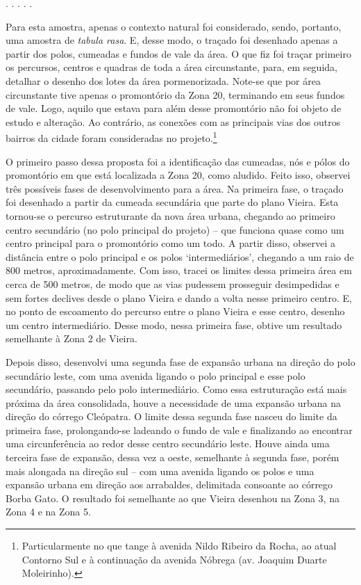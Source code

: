 \documentclass[12pt, a4paper]{book} %
\begin{document}
        \begin{center}
            . . . . .
        \end{center} 
        Para esta amostra, apenas o contexto natural foi considerado, sendo, portanto, uma amostra de \textit{tabula rasa}. E, desse modo, o traçado foi desenhado apenas a partir dos polos, cumeadas e fundos de vale da área. O que fiz foi traçar primeiro os percursos, centros e quadras de toda a área circunstante, para, em seguida, detalhar o desenho dos lotes da área pormenorizada. Note-se que por área circunstante tive apenas o promontório da Zona 20, terminando em seus fundos de vale. Logo, aquilo que estava para além desse promontório não foi objeto de estudo e alteração. Ao contrário, as conexões com as principais vias dos outros bairros da cidade foram consideradas no projeto.\footnote[0]{Particularmente no que tange à avenida Nildo Ribeiro da Rocha, ao atual Contorno Sul e à continuação da avenida Nóbrega (av. Joaquim Duarte Moleirinho).}

        O primeiro passo dessa proposta foi a identificação das cumeadas, nós e pólos do promontório em que está localizada a Zona 20, como aludido. Feito isso, observei três possíveis fases de desenvolvimento para a área. Na primeira fase, o traçado foi desenhado a partir da cumeada secundária que parte do plano Vieira. Esta tornou-se o percurso estruturante da nova área urbana, chegando ao primeiro centro secundário (no polo principal do projeto) – que funciona quase como um centro principal para o promontório como um todo. A partir disso, observei a distância entre o polo principal e os polos ‘intermediários’, chegando a um raio de 800 metros, aproximadamente. Com isso, tracei os limites dessa primeira área em cerca de 500 metros, de modo que as vias pudessem prosseguir desimpedidas e sem fortes declives desde o plano Vieira e dando a volta nesse primeiro centro. E, no ponto de escoamento do percurso entre o plano Vieira e esse centro, desenho um centro intermediário. Desse modo, nessa primeira fase, obtive um resultado semelhante à Zona 2 de Vieira.

        Depois disso, desenvolvi uma segunda fase de expansão urbana na direção do polo secundário leste, com uma avenida ligando o polo principal e esse polo secundário, passando pelo polo intermediário. Como essa estruturação está mais próxima da área consolidada, houve a necessidade de uma expansão urbana na direção do córrego Cleópatra. O limite dessa segunda fase nasceu do limite da primeira fase, prolongando-se ladeando o fundo de vale e finalizando ao encontrar uma circunferência ao redor desse centro secundário leste. Houve ainda uma terceira fase de expansão, dessa vez a oeste, semelhante à segunda fase, porém mais alongada na direção sul – com uma avenida ligando os polos e uma expansão urbana em direção aos arrabaldes, delimitada consoante ao córrego Borba Gato. O resultado foi semelhante ao que Vieira desenhou na Zona 3, na Zona 4 e na Zona 5.
\end{document}
